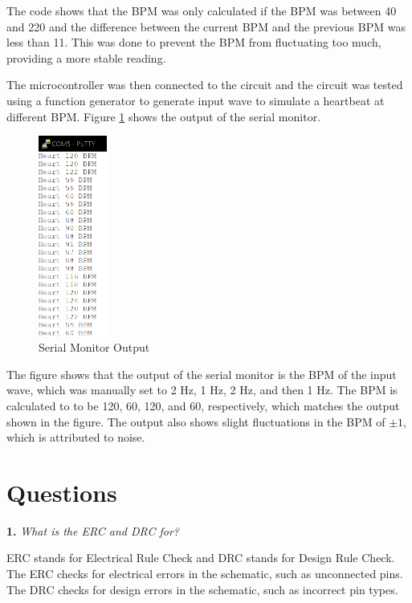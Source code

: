 \documentclass[CMPE]{KGCOEReport}
\begin{document}
The code shows that the BPM was only calculated if the BPM was between 40 and 220 and the difference between the current BPM and the previous BPM was less than 11. This was done to prevent the BPM from fluctuating too much, providing a more stable reading.

The microcontroller was then connected to the circuit and the circuit was tested using a function generator to generate input wave to simulate a heartbeat at different BPM. Figure \ref{fig:serialMonitor} shows the output of the serial monitor.

\begin{figure}[H]
    \centering
    \includegraphics[width=0.2\textwidth]{putty.png}
    \caption{Serial Monitor Output}
    \label{fig:serialMonitor}
\end{figure}

The figure shows that the output of the serial monitor is the BPM of the input wave, which was manually set to 2 Hz, 1 Hz, 2 Hz, and then 1 Hz. The BPM is calculated to to be 120, 60, 120, and 60, respectively, which matches the output shown in the figure. The output also shows slight fluctuations in the BPM of $\pm 1$, which is attributed to noise.

\section*{Questions}

\textbf{1.} \emph{What is the ERC and DRC for?}

ERC stands for Electrical Rule Check and DRC stands for Design Rule Check. The ERC checks for electrical errors in the schematic, such as unconnected pins. The DRC checks for design errors in the schematic, such as incorrect pin types.

\bigskip
\end{document}
